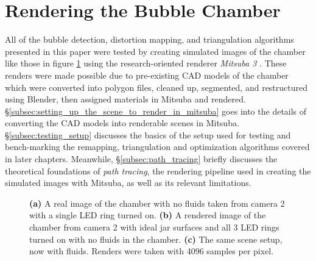 \documentclass[11pt, letterpaper]{extarticle} %
\begin{document}
\section{Rendering the Bubble Chamber} \label{sec:rendering_the_bubble_chamber}
All of the bubble detection, distortion mapping, and triangulation algorithms presented in this paper were tested by creating simulated images of the chamber like those in figure \ref{fig:real_and_rendered_images} using the research-oriented renderer \textit{Mitsuba 3} \cite{jakob2022mitsuba3}. These renders were made possible due to pre-existing CAD models of the chamber which were converted into polygon files, cleaned up, segmented, and restructured using Blender, then assigned materials in Mitsuba and rendered. \S\ref{subsec:setting_up_the_scene_to_render_in_mitsuba} goes into the details of converting the CAD models into renderable scenes in Mitsuba. \S\ref{subsec:testing_setup} discusses the basics of the setup used for testing and bench-marking the remapping, triangulation and optimization algorithms covered in later chapters. Meanwhile, \S\ref{subsec:path_tracing} briefly discusses the theoretical foundations of \textit{path tracing}, the rendering pipeline used in creating the simulated images with Mitsuba, as well as its relevant limitations.

\begin{figure}[h]
    \centering
    \hfill
    \hfill
    \caption{\textbf{(a)} A real image of the chamber with no fluids taken from camera 2 with a single LED ring turned on. \textbf{(b)} A rendered image of the chamber from camera 2 with ideal jar surfaces and all 3 LED rings turned on with no fluids in the chamber. \textbf{(c)} The same scene setup, now with fluids. Renders were taken with 4096 samples per pixel.}
    \label{fig:real_and_rendered_images}
\end{figure}
\end{document}

